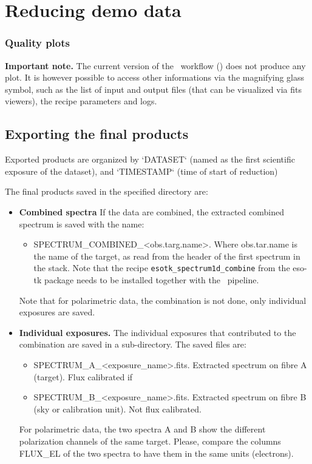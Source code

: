 
\section{Reducing demo data}
\label{sec:reducing_demo_data}



 
\subsubsection{Quality plots}


{\bf Important note.} The current version of the \instname\ workflow (\pipelinevers) does not produce any plot. It is however possible to access other informations via the magnifying glass symbol, such as the list of input and output files (that can be visualized via fits viewers), the recipe parameters and logs.


\subsection{Exporting the final products}
\label{sec:export_final_products}



 
 
Exported products are organized by `DATASET` (named as the first
scientific exposure of the dataset), and `TIMESTAMP` (time of start of
reduction)

The final products saved in the specified directory are: 


\begin{itemize}
\item {\bf Combined spectra} If the data are combined, the extracted combined spectrum is saved with the name:
\begin{itemize}
\item SPECTRUM\_COMBINED\_<obs.targ.name>. Where obs.tar.name is the name of the target, as read from the header of the first spectrum in the stack. Note that the recipe {\tt esotk\_spectrum1d\_combine} from the eso-tk package needs to be installed together with the \pipename\ pipeline.
\end{itemize}
Note that for polarimetric data, the combination is not done, only individual exposures are saved.

\item {\bf Individual exposures.}
The individual exposures that contributed to the combination are saved in a sub-directory. The saved files are:
\begin{itemize}
\item SPECTRUM\_A\_<exposure\_name>.fits. Extracted spectrum on fibre A (target). Flux calibrated if 
\item SPECTRUM\_B\_<exposure\_name>.fits. Extracted spectrum on fibre B (sky or calibration unit). Not flux calibrated.
\end{itemize}
For polarimetric data, the two spectra A and B show the different polarization channels of the same target. Please, compare the columns FLUX\_EL of the two spectra to have them in the same units (electrons).

\end{itemize}
